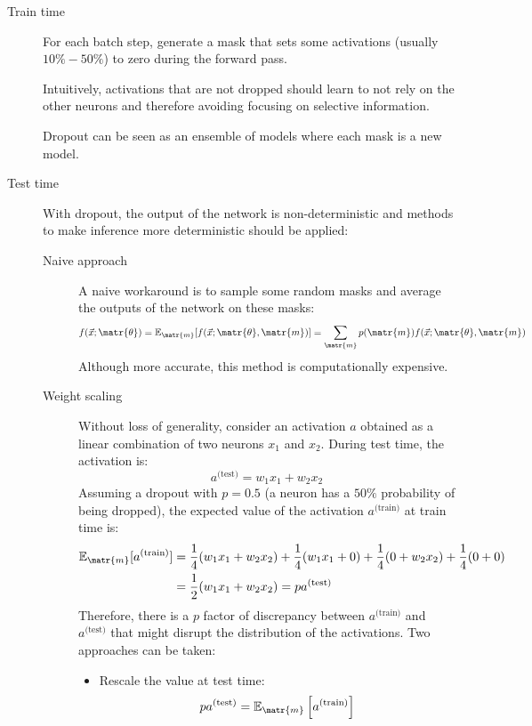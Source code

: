 \begin{description}
    \item[Train time] 
        For each batch step, generate a mask that sets some activations (usually $10\% - 50\%$) to zero during the forward pass.
        
        \begin{remark}
            Intuitively, activations that are not dropped should learn to not rely on the other neurons and therefore avoiding focusing on selective information.
        \end{remark}
        
        \begin{remark}
            Dropout can be seen as an ensemble of models where each mask is a new model.
        \end{remark}

    \item[Test time] 
        With dropout, the output of the network is non-deterministic and methods to make inference more deterministic should be applied:
        \begin{description}
            \item[Naive approach] 
                A naive workaround is to sample some random masks and average the outputs of the network on these masks:
                \[ f(\vec{x}; \matr{\theta}) = \mathbb{E}_\matr{m} [ f(\vec{x}; \matr{\theta}, \matr{m}) ] = \sum_\matr{m} p(\matr{m}) f(\vec{x}; \matr{\theta}, \matr{m}) \]
                Although more accurate, this method is computationally expensive.

            \item[Weight scaling] 
                Without loss of generality, consider an activation $a$ obtained as a linear combination of two neurons $x_1$ and $x_2$.
                During test time, the activation is:
                \[ a^\text{(test)} = w_1 x_1 + w_2 x_2 \]
                Assuming a dropout with $p=0.5$ (a neuron has a $50\%$ probability of being dropped), the expected value of the activation $a^\text{(train)}$ at train time is:
                \[  
                    \begin{split}
                        \mathbb{E}_\matr{m} [ a^\text{(train)} ] &= \frac{1}{4}(w_1 x_1 + w_2 x_2) + \frac{1}{4}(w_1 x_1 + 0) + \frac{1}{4}(0 + w_2 x_2) + \frac{1}{4}(0 + 0) \\
                            &= \frac{1}{2}(w_1 x_1 + w_2 x_2) = p a^\text{(test)}
                    \end{split}
                \]
                Therefore, there is a $p$ factor of discrepancy between $a^\text{(train)}$ and $a^\text{(test)}$ that might disrupt the distribution of the activations. Two approaches can be taken:
                \begin{itemize}
                    \item Rescale the value at test time:
                        \[ p a^\text{(test)} = \mathbb{E}_\matr{m} \left[ a^\text{(train)} \right] \]


\end{itemize}
\end{description}
\end{description}
